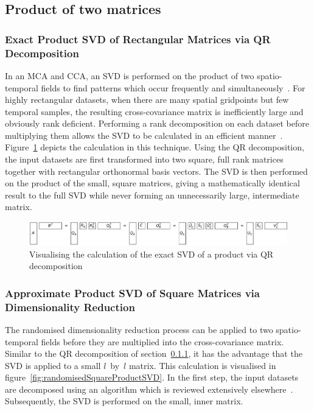 \documentclass[ijgi,article,submit,moreauthors,pdftex,10pt,a4paper]{Definitions/mdpi}
\begin{document}
\subsection{Product of two matrices}

\subsubsection{Exact Product SVD of Rectangular Matrices via QR Decomposition}
\label{sec:Results/Exact Product SVD of Rectangular Matrices via QR Decomposition}
In an MCA and CCA, an SVD is performed on the product of two spatio-temporal fields to find patterns which occur frequently and simultaneously~\cite{Eshel2011, Storch1999}. For highly rectangular datasets, when there are many spatial gridpoints but few temporal samples, the resulting cross-covariance matrix is inefficiently large and obviously rank deficient. Performing a rank decomposition on each dataset before multiplying them allows the SVD to be calculated in an efficient manner~\cite{Chan1982, Tygert2017}. Figure~\ref{fig:qrProductSVD} depicts the calculation in this technique. Using the QR decomposition, the input datasets are first transformed into two square, full rank matrices together with rectangular orthonormal basis vectors. The SVD is then performed on the product of the small, square matrices, giving a mathematically identical result to the full SVD while never forming an unnecessarily large, intermediate matrix.

\begin{figure}[H]
\centering
\includegraphics[width=\textwidth]{Results/qrProductSVD.pdf}
\caption[Exact SVD via QR decomposition]{Visualising the calculation of the exact SVD of a product via QR decomposition}
\label{fig:qrProductSVD}
\end{figure}

\subsubsection{Approximate Product SVD of Square Matrices via Dimensionality Reduction}
\label{sec:Results/Approximate Product SVD of Square Matrices via Dimensionality Reduction}
The randomised dimensionality reduction process can be applied to two spatio-temporal fields before they are multiplied into the cross-covariance matrix. Similar to the QR decomposition of section~\ref{sec:Results/Exact Product SVD of Rectangular Matrices via QR Decomposition}, it has the advantage that the SVD is applied to a small $l$~by~$l$ matrix. This calculation is visualised in figure~\ref{fig:randomisedSquareProductSVD}. In the first step, the input datasets are decomposed using an algorithm which is reviewed extensively elsewhere~\cite{Halko2011, Li2016}. Subsequently, the SVD is performed on the small, inner matrix.
\end{document}
